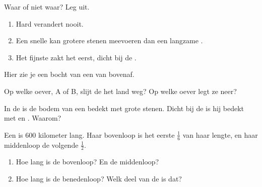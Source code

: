 \begin{exercise}[$\star$]\label{exo:g5:water-shapes-the-land:4}
Waar of niet waar? Leg uit.
\begin{enumerate}
  \item[(a)] Hard  verandert nooit.
  \item[(b)] Een snelle  kan grotere stenen meevoeren dan een
        langzame .
  \item[(c)] Het fijnste  zakt het eerst, dicht bij de .
\end{enumerate}
\end{exercise}

\begin{exercise}[$\star$]\label{exo:g5:water-shapes-the-land:5}
Hier zie je een bocht van een  van bovenaf.

\begin{center}
\end{center}
Op welke oever, A of B, slijt de  het land weg? Op welke oever legt
ze  neer?
\end{exercise}

\begin{exercise}[$\star$]\label{exo:g5:water-shapes-the-land:6}
In de  is de bodem van een  bedekt met grote stenen. Dicht bij
de  is hij bedekt met  en . Waarom?
\end{exercise}

\begin{exercise}[$\star\star$]\label{exo:g5:water-shapes-the-land:7}
Een  is 600 kilometer lang. Haar bovenloop is het eerste
$\frac{1}{6}$ van haar lengte, en haar middenloop de volgende
$\frac{1}{2}$.
\begin{enumerate}
  \item[(a)] Hoe lang is de bovenloop? En de middenloop?
  \item[(b)] Hoe lang is de benedenloop? Welk deel van de  is dat?
\end{enumerate}
\end{exercise}

